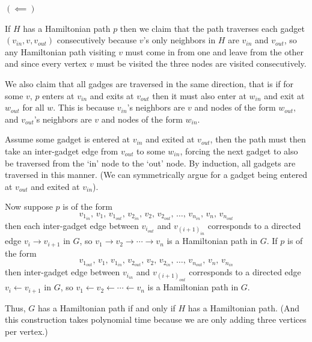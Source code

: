 \documentclass[12pt]{article}
\begin{document}
\begin{solution}
\begin{enumerate}
        $(\impliedby)$

        If $H$ has a Hamiltonian path $p$ then we claim that the path traverses each gadget $(v_{in}, v, v_{out})$ consecutively because $v$'s only neighbors in $H$ are $v_{in}$ and $v_{out}$, so any Hamiltonian path visiting $v$ must come in from one and leave from the other and since every vertex $v$ must be visited the three nodes are visited consecutively. 
        
        We also claim that all gadges are  traversed in the same direction, that is if for some $v$, $p$ enters at $v_{in}$ and exits at $v_{out}$ then it must also enter at $w_{in}$ and exit at $w_{out}$ for all $w$. This is because $v_{in}$'s neighbors are $v$ and nodes of the form $w_{out}$, and $v_{out}$'s neighbors are $v$ and nodes of the form $w_{in}$. 
        
        Assume some gadget is entered at $v_{in}$ and exited at $v_{out}$, then the path must then take an inter-gadget edge from $v_{out}$ to some $w_{in}$, 
        forcing the next gadget to also be traversed from the `in' node to the `out' node. By induction, all gadgets are traversed in this manner. (We can symmetrically argue for a gadget being entered at $v_{out}$ and exited at $v_{in}$). 

        Now suppose $p$ is of the form 
        \[v_{1_{in}},\, v_1,\, v_{1_{out}},\, v_{2_{in}},\, v_2,\, v_{2_{out}},\, 
        \ldots,\, v_{n_{in}},\, v_n,\, v_{n_{out}}\]
        then each inter-gadget edge between $v_{i_{out}}$ and  $v_{{(i+1)}_{in}}$ corresponds to 
        a directed edge $v_i \to v_{i+1}$ in $G$, so $v_1 \to v_2 \to \cdots \to v_n$ 
        is a Hamiltonian path in $G$. If $p$ is of the form 
        \[v_{1_{out}},\, v_1,\, v_{1_{in}},\, v_{2_{out}},\, v_2,\, v_{2_{in}},\, 
        \ldots,\, v_{n_{out}},\, v_n,\, v_{n_{in}}\]
        then inter-gadget edge between $v_{i_{in}}$ and $v_{{(i+1)}_{out}}$ corresponds to 
        a directed edge $v_i \leftarrow v_{i+1}$ in $G$, so $v_1 \leftarrow v_2 \leftarrow \cdots \leftarrow v_n$  is a Hamiltonian path in $G$.


        Thus, $G$ has a Hamiltonian path if and only if $H$ has a Hamiltonian path. (And this construction takes polynomial time because we are only adding three vertices per vertex.)
    \end{enumerate}
\end{solution}
\end{document}

